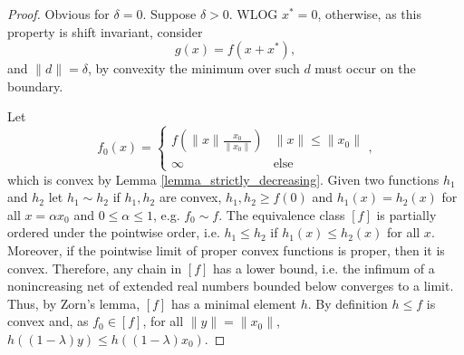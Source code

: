 \documentclass[12pt]{article}
\begin{document}
\begin{proof}
Obvious for $\delta = 0$.
Suppose $\delta > 0$.
WLOG $x^{\ast} = 0$, otherwise, as this property is shift invariant, consider
\begin{equation*}
g(x) = f(x+x^{\ast}),
\end{equation*}
and $\lVert d \rVert = \delta$, by convexity the minimum over such $d$ must occur on the boundary.

Let
\begin{equation*}
f_{0}(x)
=
\begin{cases}
f\left( \lVert x \rVert \frac{ x_{0} }{\lVert x_{0} \rVert } \right) & \lVert x \rVert \le \lVert x_{0} \rVert \\
\infty & \text{else}
\end{cases},
\end{equation*}
which is convex by Lemma \ref{lemma_strictly_decreasing}.
Given two functions $h_{1}$ and $h_{2}$ let $h_{1} \sim h_{2}$ if $h_{1},h_{2}$ are convex, $h_{1},h_{2} \ge f(0)$ and $h_{1}(x) = h_{2}(x)$ for all $x = \alpha x_{0}$ and $0 \le \alpha \le 1$, e.g. $f_{0} \sim f$.
The equivalence class $[f]$ is partially ordered under the pointwise order, i.e. $h_{1} \le h_{2}$ if $h_{1}(x) \le h_{2}(x)$ for all $x$.
Moreover, if the pointwise limit of proper convex functions is proper, then it is convex.
Therefore, any chain in $[f]$ has a lower bound, i.e. the infimum of a nonincreasing net of extended real numbers bounded below converges to a limit.
Thus, by Zorn's lemma, $[f]$ has a minimal element $h$.
By definition $h \le f$ is convex and, as $f_{0} \in [f]$, for all $\lVert y \rVert = \lVert x_{0} \rVert$, $h((1-\lambda)y) \le h((1-\lambda)x_{0})$.


\end{proof}
\end{document}
